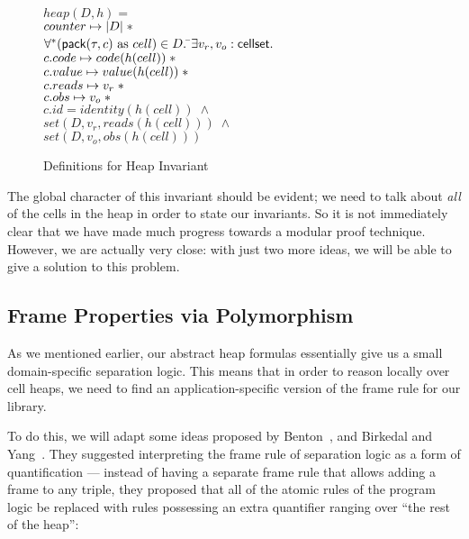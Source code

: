 \begin{figure}
\begin{tabbing}
$heap(D,h) = $ \\
\;\;$counter \mapsto |D| \;* $ \\
\;\;$\forall^* (\mathsf{pack}({\tau}, {c})\mbox{ as }cell) \in D.\;$\=$\exists v_r, v_o : \mathsf{cellset}.\;$ \\
                         \>$c.code \mapsto code(h(cell))   \;* $ \\
                         \>$c.value \mapsto value(h(cell)) \;* $ \\
                         \>$c.reads \mapsto v_r \;* $ \\
                         \>$c.obs   \mapsto v_o \;* $ \\
                         \>$c.id    = identity(h(cell)) \;\land$ \\
                         \>$set(D, v_r, reads(h(cell))) \;\land$ \\
                         \>$set(D, v_o, obs(h(cell)))$ 
\end{tabbing}

\caption{Definitions for Heap Invariant}
\label{heap-invariant}
\end{figure}

The global character of this invariant should be evident; we need to
talk about \emph{all} of the cells in the heap in order to state our
invariants. So it is not immediately clear that we have made much
progress towards a modular proof technique. However, we are actually
very close: with just two more ideas, we will be able to give a
solution to this problem.

\subsection{Frame Properties via Polymorphism}

As we mentioned earlier, our abstract heap formulas essentially give
us a small domain-specific separation logic. This means that in order
to reason locally over cell heaps, we need to find an
application-specific version of the frame rule for our library. 

To do this, we will adapt some ideas proposed by
Benton~\cite{benton}, and Birkedal and Yang~\cite{birkedal-yang}. They
suggested interpreting the frame rule of separation logic as a form of
quantification --- instead of having a separate frame rule that allows
adding a frame to any triple, they proposed that all of the atomic
rules of the program logic be replaced with rules possessing an extra
quantifier ranging over ``the rest of the heap'':

